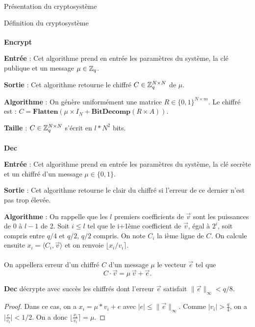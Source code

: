 \begin{section}{Présentation du cryptosystème}
\begin{subsection}{Définition du cryptosystème}
	\paragraph{}
	\textbf{Encrypt}
	\flushleft
	
	\textbf{Entrée} : Cet algorithme prend en entrée les paramètres du système, la clé publique et un message $\mu \in \mathbb{Z}_q$.

	\textbf{Sortie} : Cet algorithme retourne le chiffré $C \in \mathbb{Z}_q^{N \times N}$ de $\mu$.

	\textbf{Algorithme} : On génère uniformément une matrice $R \in \{ 0,1\} ^{N \times m}$. Le chiffré est : $C = \textbf{Flatten}(\mu \times I_N + \textbf{BitDecomp}(R \times A))$.

	\textbf{Taille} : $C \in \mathbb{Z}_q^{N \times N}$ s'écrit en $l * N^2$ bits.
	
	\paragraph{}
	\textbf{Dec}
	\flushleft
	
	\textbf{Entrée} : Cet algorithme prend en entrée les paramètres du système, la clé secrète et un chiffré d'un message $\mu \in \{ 0,1\} $.

	\textbf{Sortie} : Cet algorithme retourne le clair du chiffré si l'erreur de ce dernier n'est pas trop élevée.

	\textbf{Algorithme} : On rappelle que les $l$ premiers coefficients de $\vec{v}$ sont les puissances de 0 à $l-1$ de 2. Soit $i \leqslant l$ tel que le i+1ème coefficient de $\vec{v}$, égal à $2^{i}$, soit compris entre $q/4$ et $q/2$, $q/2$ compris. On note $C_i$ la ième ligne de $C$. On calcule ensuite $x_i = \langle C_i, \vec{v} \rangle$ et on renvoie $\lfloor x_i/v_i \rceil$.


\paragraph{}
\begin{definition}
On appellera erreur d'un chiffré $C$ d'un message $\mu$ le vecteur $\vec{e}$ tel que
\[ C\cdot \vec{v} = \mu\, \vec{v} + \vec{e}. \]
\end{definition}

\begin{prop}
\label{dec}
\textbf{Dec} décrypte avec succès les chiffrés dont l'erreur $\vec{e}$ satisfait $\|\vec{e}\|_\infty < q/8$.
\end{prop}
\begin{proof}
	Dans ce cas, on a $x_i = \mu * v_i + e$ avec $\lvert e \lvert \leqslant \|\vec{e}\|_\infty$. Comme $\lvert v_i \lvert > \frac{q}{4}$, on a $\lvert \frac{e}{v_i} \lvert < 1/2$. On a donc $\lfloor \frac{x_i}{v_i} \rceil = \mu$.
\end{proof}
	\end{subsection}
	

\end{section}
